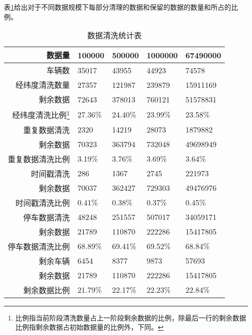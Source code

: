 \documentclass[UTF8]{ctexart}
\begin{document}
表\ref{data}给出对于不同数据规模下每部分清理的数据和保留的数据的数量和所占的比例。
\begin{table}[h]
    \begin{center}
        \caption{数据清洗统计表}
        \label{data}
    \begin{minipage}{\textwidth}
    \centering
    \begin{tabular}{r|l|l|l|l}
        \hline \hline
    \textbf{数据量} & \textbf{100000} & \textbf{500000} & \textbf{1000000} & \textbf{67490000} \\ \hline
    车辆数 & 35017 & 43955 & 44923 & 74578 \\ \hline \hline
    经纬度清洗数量 & 27357 & 121987 & 239879 & 15911169 \\ \hline 
    剩余数据 & 72643 & 378013 & 760121 & 51578831 \\ \hline
    经纬度清洗比例\footnote{比例指当前阶段清洗数量占上一阶段剩余数据的比例，除最后一行的剩余数据比例指剩余数据占初始数据量的比例外，下同。} & 27.36\% & 24.40\% & 23.99\% & 23.58\% \\ \hline \hline
    重复数据清洗 & 2320 & 14219 & 28073 & 1879882 \\ \hline
    剩余数据 & 70323 & 363794 & 732048 & 49698949 \\ \hline
    重复数据清洗比例 & 3.19\% & 3.76\% & 3.69\% & 3.64\% \\ \hline \hline
    时间戳清洗 & 286 & 1367 & 2745 & 221973 \\ \hline
    剩余数据 & 70037 & 362427 & 729303 & 49476976 \\ \hline
    时间戳清洗比例 & 0.41\% & 0.38\% & 0.37\% & 0.45\% \\ \hline \hline
    停车数据清洗 & 48248 & 251557 & 507017 & 34059171 \\ \hline
    剩余数据 & 21789 & 110870 & 222286 & 15417805 \\ \hline
    停车数据清洗比例 & 68.89\% & 69.41\% & 69.52\% & 68.84\% \\ \hline \hline
    剩余车辆 & 6454 & 8377 & 9873 & 57693 \\ \hline
    剩余数据 & 21789 & 110870 & 222286 & 15417805 \\ \hline
    剩余数据比例 & 21.79\% & 22.17\% & 22.23\% & 22.84\% \\ 
    \hline \hline
    \end{tabular}
    \end{minipage}    

    \end{center}
    \end{table}
\end{document}
